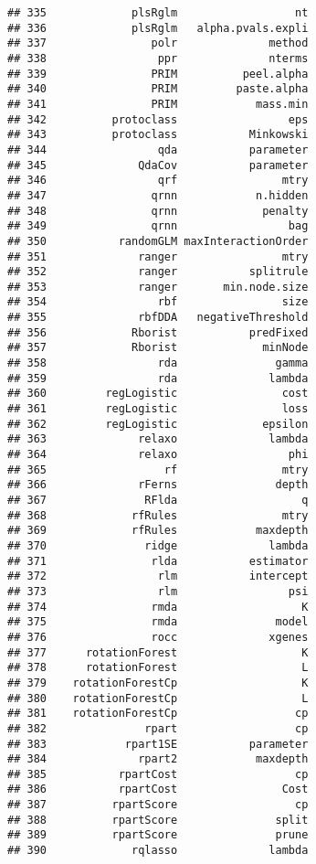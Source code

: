 \documentclass[
]{article}
\begin{document}
\begin{verbatim}
## 335             plsRglm                  nt
## 336             plsRglm   alpha.pvals.expli
## 337                polr              method
## 338                 ppr              nterms
## 339                PRIM          peel.alpha
## 340                PRIM         paste.alpha
## 341                PRIM            mass.min
## 342          protoclass                 eps
## 343          protoclass           Minkowski
## 344                 qda           parameter
## 345              QdaCov           parameter
## 346                 qrf                mtry
## 347                qrnn            n.hidden
## 348                qrnn             penalty
## 349                qrnn                 bag
## 350           randomGLM maxInteractionOrder
## 351              ranger                mtry
## 352              ranger           splitrule
## 353              ranger       min.node.size
## 354                 rbf                size
## 355              rbfDDA   negativeThreshold
## 356             Rborist           predFixed
## 357             Rborist             minNode
## 358                 rda               gamma
## 359                 rda              lambda
## 360         regLogistic                cost
## 361         regLogistic                loss
## 362         regLogistic             epsilon
## 363              relaxo              lambda
## 364              relaxo                 phi
## 365                  rf                mtry
## 366              rFerns               depth
## 367               RFlda                   q
## 368             rfRules                mtry
## 369             rfRules            maxdepth
## 370               ridge              lambda
## 371                rlda           estimator
## 372                 rlm           intercept
## 373                 rlm                 psi
## 374                rmda                   K
## 375                rmda               model
## 376                rocc              xgenes
## 377      rotationForest                   K
## 378      rotationForest                   L
## 379    rotationForestCp                   K
## 380    rotationForestCp                   L
## 381    rotationForestCp                  cp
## 382               rpart                  cp
## 383            rpart1SE           parameter
## 384              rpart2            maxdepth
## 385           rpartCost                  cp
## 386           rpartCost                Cost
## 387          rpartScore                  cp
## 388          rpartScore               split
## 389          rpartScore               prune
## 390             rqlasso              lambda

\end{verbatim}
\end{document}
